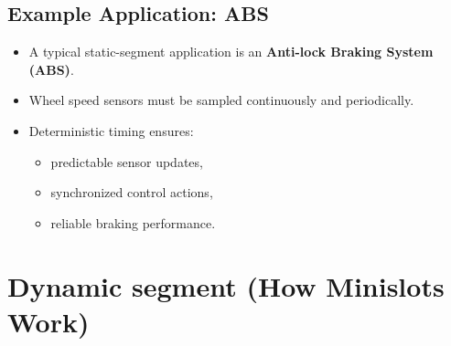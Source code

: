 \subsection*{Example Application: ABS}

\begin{itemize}
    \item A typical static-segment application is an
    \textbf{Anti-lock Braking System (ABS)}.
    
    \item Wheel speed sensors must be sampled continuously and periodically.
    
    \item Deterministic timing ensures:
    \begin{itemize}
        \item predictable sensor updates,
        \item synchronized control actions,
        \item reliable braking performance.
    \end{itemize}
\end{itemize}

\section{Dynamic segment (How Minislots Work)}

